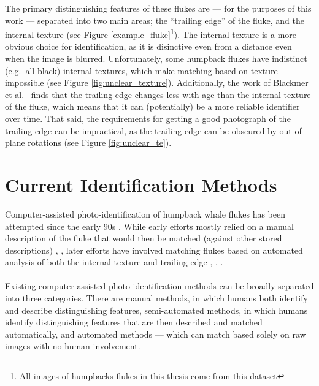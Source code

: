 The primary distinguishing features of these flukes are --- for the purposes of this work --- separated into two main areas; the ``trailing edge'' of the fluke, and the internal texture (see Figure \ref{example_fluke}\footnote{All images of humpbacks flukes in this thesis come from this dataset}).
The internal texture is a more obvious choice for identification, as it is disinctive even from a distance even when the image is blurred.
Unfortunately, some humpback flukes have indistinct (e.g.\ all-black) internal textures, which make matching based on texture impossible (see Figure \ref{fig:unclear_texture}).
Additionally, the work of Blackmer et al.\ \cite{blackmer2000temporal} finds that the trailing edge changes less with age than the internal texture of the fluke, which means that it can (potentially) be a more reliable identifier over time.
That said, the requirements for getting a good photograph of the trailing edge can be impractical, as the trailing edge can be obscured by out of plane rotations (see Figure \ref{fig:unclear_te}).


\section{Current Identification Methods}

Computer-assisted photo-identification of humpback whale flukes has been attempted since the early 90s \cite{mizroch1990computer}.
While early efforts mostly relied on a manual description of the fluke that would then be matched (against other stored descriptions) \cite{mizroch1990computer}, \cite{whitehead1990computer}, later efforts have involved matching flukes based on automated analysis of both the internal texture and trailing edge \cite{hughes2015automated}, \cite{kniest2010fluke}, \cite{i3scontour}.
\\\\
Existing computer-assisted photo-identification methods can be broadly separated into three categories.
There are manual methods, in which humans both identify and describe distinguishing features, semi-automated methods, in which humans identify distinguishing features that are then described and matched automatically, and automated methods --- which can match based solely on raw images with no human involvement. 


